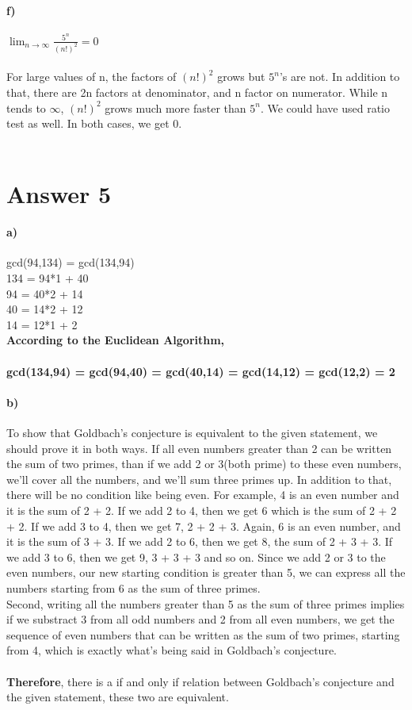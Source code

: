 \documentclass[12pt]{article}
\begin{document}
\paragraph{f)} $\displaystyle{\lim_{n \to \infty}} \frac{5^n}{(n!)^2} = 0$\\\\
For large values of n, the factors of $(n!)^2$ grows but $5^n$'s are not. In addition to that, there are 2n factors at denominator, and n factor on numerator. While n tends to $\infty$, $(n!)^2$ grows much more faster than $5^n$. We could have used ratio test as well. In both cases, we get 0.\\\\

\section*{Answer 5}
\paragraph{a)}
gcd(94,134) = gcd(134,94)\\
134 = 94*1 + 40 \\
94 = 40*2 + 14 \\
40 = 14*2 + 12 \\
14 = 12*1 + 2 \\

\textbf{According to the Euclidean Algorithm, \\\\
gcd(134,94) = gcd(94,40) = gcd(40,14) = gcd(14,12) = gcd(12,2) = 2}

\paragraph{b)}
To show that Goldbach's conjecture is equivalent to the given statement, we should prove it in both ways. If all even numbers greater than 2 can be written the sum of two primes, than if we add 2 or 3(both prime) to these even numbers, we'll cover all the numbers, and we'll sum three primes up. In addition to that, there will be no condition like being even. For example, 4 is an even number and it is the sum of 2 + 2. If we add 2 to 4, then we get 6 which is the sum of 2 + 2 + 2. If we add 3 to 4, then we get 7, 2 + 2 + 3. Again, 6 is an even number, and it is the sum of 3 + 3. If we add 2 to 6, then we get 8, the sum of 2 + 3 + 3. If we add 3 to 6, then we get 9, 3 + 3 + 3 and so on. Since we add 2 or 3 to the even numbers, our new starting condition is greater than 5, we can express all the numbers starting from 6 as the sum of three primes.\\

Second, writing all the numbers greater than 5 as the sum of three primes implies if we substract 3 from all odd numbers and 2 from all even numbers, we get the sequence of even numbers that can be written as the sum of two primes, starting from 4, which is exactly what's being said in Goldbach's conjecture.\\\\
\textbf{Therefore}, there is a if and only if relation between Goldbach's conjecture and the given statement, these two are equivalent.
\end{document}
